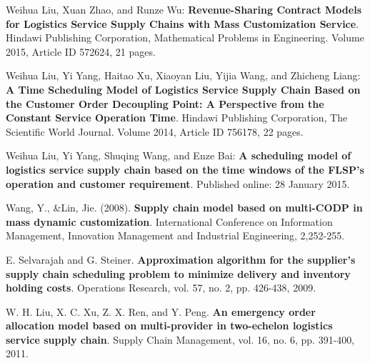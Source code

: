 \documentclass{llncs}
\begin{document}
%
%
%
% 
% 
%
\begin{thebibliography}{8}
Weihua Liu, Xuan Zhao, and Runze Wu: \textbf{Revenue-Sharing Contract Models for Logistics Service Supply Chains with Mass Customization Service}. Hindawi Publishing Corporation, Mathematical Problems in Engineering. Volume 2015, Article ID 572624, 21 pages.

Weihua Liu, Yi Yang, Haitao Xu, Xiaoyan Liu, Yijia Wang, and Zhicheng Liang: \textbf{A Time Scheduling Model of Logistics Service Supply Chain Based on the Customer Order Decoupling Point: A Perspective from the Constant Service Operation Time}. Hindawi Publishing Corporation, The Scientific World Journal. Volume 2014, Article ID 756178, 22 pages.

Weihua Liu, Yi Yang, Shuqing Wang, and Enze Bai: \textbf{A scheduling model of logistics service supply chain based on the time windows of the FLSP's operation and customer requirement}. Published online: 28 January 2015.

Wang, Y., \&Lin, Jie. (2008). \textbf{Supply chain model based on multi-CODP in mass dynamic customization}. International Conference on Information Management, Innovation Management and Industrial Engineering, 2,252-255.

E. Selvarajah and G. Steiner. \textbf{Approximation algorithm for the supplier's supply chain scheduling problem to minimize delivery and inventory holding costs}. Operations Research, vol. 57, no. 2, pp. 426-438, 2009.

W. H. Liu, X. C. Xu, Z. X. Ren, and Y. Peng. \textbf{An emergency order allocation model based on multi-provider in two-echelon logistics service supply chain}. Supply Chain Management, vol. 16, no. 6, pp. 391-400, 2011.
\end{thebibliography}
\end{document}
